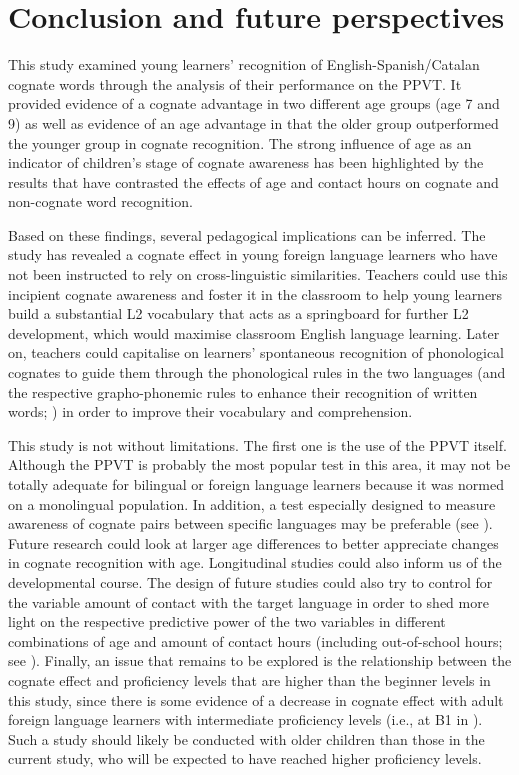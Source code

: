 \documentclass[output=paper,modfonts,nonflat,newtxmath]{langsci/langscibook}
\begin{document}
\section{Conclusion and future perspectives}

This study examined young learners’ recognition of English-Spanish/Catalan cognate words through the analysis of their performance on the PPVT. It provided evidence of a cognate advantage in two different age groups (age 7 and 9) as well as evidence of an age advantage in that the older group outperformed the younger group in cognate recognition. The strong influence of age as an indicator of children’s stage of cognate awareness has been highlighted by the results that have contrasted the effects of age and contact hours on cognate and non-cognate word recognition.

 {Based on these findings, several pedagogical implications can be inferred. The study has revealed a cognate effect in young foreign language learners who have not been instructed to rely on cross-linguistic similarities. Teachers could use this incipient cognate awareness and foster it in the classroom to help young learners build a substantial L2 vocabulary that acts as a springboard for further L2 development, which would maximise classroom English language learning. Later on, teachers could capitalise on learners’ spontaneous recognition of phonological cognates to guide them through the phonological rules in the two languages (and the respective grapho-phonemic rules to enhance their recognition of written words; \citealt{LázaroIbarrola2010}) in order to improve their vocabulary and comprehension.}

 {This study is not without limitations. The first one is the use of the PPVT itself. Although the PPVT is probably the most popular test in this area, it may not be totally adequate for bilingual or foreign language learners because it was normed on a monolingual population. In addition, a test especially designed to measure awareness of cognate pairs between specific languages may be preferable (see \citealt{GoriotEtAl2018,LesniewskaEtAl2018}). Future research could look at larger age differences to better appreciate changes in cognate recognition with age. Longitudinal studies could also inform us of the developmental course. The design of future studies could also try to control for the variable amount of contact with the target language in order to shed more light on the respective predictive power of the two variables in different combinations of age and amount of contact hours (including out-of-school hours; see \citealt{MuñozEtAl2018}).  Finally, an issue that remains to be explored is the relationship between the cognate effect and proficiency levels that are higher than the beginner levels in this study, since there is some evidence of a decrease in cognate effect with adult foreign language learners with intermediate proficiency levels (i.e., at B1 in \citealt{CasaponsaEtAl2015}). Such a study should likely be conducted with older children than those in the current study, who will be expected to have reached higher proficiency levels.}
\end{document}
